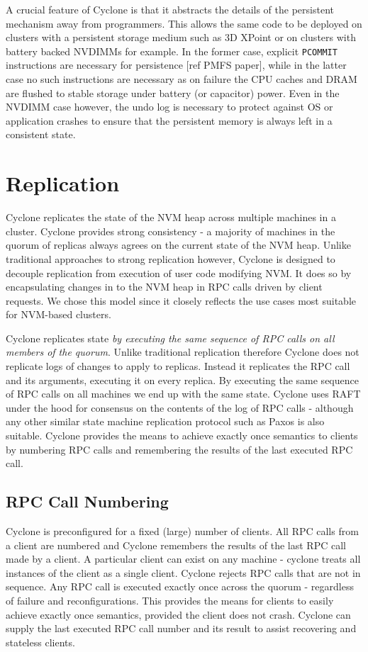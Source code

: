 \documentclass[twocolumn]{article}
\begin{document}
A crucial feature of Cyclone is that it abstracts the details of the persistent
mechanism away from programmers. This allows the same code to be deployed on
clusters with a persistent storage medium such as 3D XPoint or on clusters with
battery backed NVDIMMs for example. In the former case, explicit {\tt PCOMMIT}
instructions are necessary for persistence [ref PMFS paper], while in the latter
case no such instructions are necessary as on failure the CPU caches and DRAM
are flushed to stable storage under battery (or capacitor) power. Even in the
NVDIMM case however, the undo log is necessary to protect against OS or
application crashes to ensure that the persistent memory is always left in a
consistent state.


\section{Replication}
Cyclone replicates the state of the NVM heap across multiple machines in a
cluster. Cyclone provides strong consistency - a majority of machines in the
quorum of replicas always agrees on the current state of the NVM heap. Unlike
traditional approaches to strong replication however, Cyclone is designed to
decouple replication from execution of user code modifying NVM. It does so by
encapsulating changes in to the NVM heap in RPC calls driven by client requests.
We chose this model since it closely reflects the use cases most suitable for
NVM-based clusters.

Cyclone replicates state \emph{by executing the same sequence of RPC calls on
  all members of the quorum}. Unlike traditional replication therefore Cyclone
does not replicate logs of changes to apply to replicas. Instead it replicates
the RPC call and its arguments, executing it on every replica. By executing the
same sequence of RPC calls on all machines we end up with the same
state. Cyclone uses RAFT under the hood for consensus on the contents of the log
of RPC calls - although any other similar state machine replication protocol
such as Paxos is also suitable. Cyclone provides the means to achieve exactly
once semantics to clients by numbering RPC calls and remembering the results of
the last executed RPC call.

\subsection{RPC Call Numbering}
Cyclone is preconfigured for a fixed (large) number of clients. All RPC calls
from a client are numbered and Cyclone remembers the results of the last RPC
call made by a client. A particular client can exist on any machine - cyclone
treats all instances of the client as a single client. Cyclone rejects RPC calls
that are not in sequence. Any RPC call is executed exactly once across the
quorum - regardless of failure and reconfigurations. This provides the means for
clients to easily achieve exactly once semantics, provided the client does not
crash. Cyclone can supply the last executed RPC call number and its result to
assist recovering and stateless clients.
\end{document}
